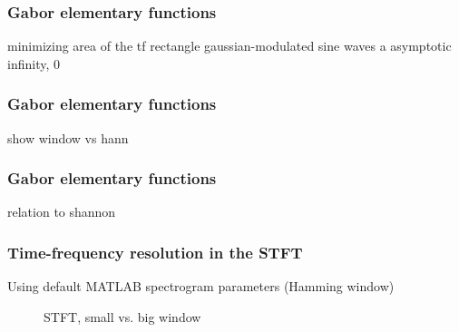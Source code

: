 \documentclass{beamer}
\begin{document}
\begin{frame}
	\frametitle{Gabor elementary functions}
	minimizing area of the tf rectangle
	gaussian-modulated sine waves
	a asymptotic infinity, 0
\end{frame}

\begin{frame}
	\frametitle{Gabor elementary functions}
	show window vs hann
\end{frame}

\begin{frame}
	\frametitle{Gabor elementary functions}
	relation to shannon
\end{frame}

\begin{frame}
	\frametitle{Time-frequency resolution in the STFT}
	Using default MATLAB spectrogram parameters (Hamming window)
	\begin{figure}
		\vspace{-1em}
		\centering
		\caption{STFT, small vs. big window}
	\end{figure}
\end{frame}
\end{document}
